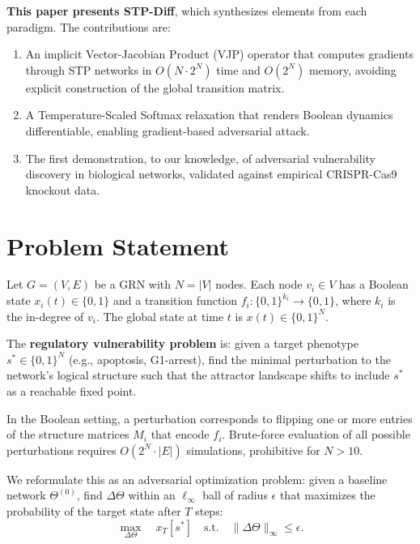 \documentclass[11pt,a4paper]{article}
\begin{document}
\textbf{This paper presents STP-Diff}, which synthesizes elements from each paradigm. The contributions are:
\begin{enumerate}[leftmargin=*]
    \item An implicit Vector-Jacobian Product (VJP) operator that computes gradients through STP networks in $O(N \cdot 2^N)$ time and $O(2^N)$ memory, avoiding explicit construction of the global transition matrix.
    \item A Temperature-Scaled Softmax relaxation that renders Boolean dynamics differentiable, enabling gradient-based adversarial attack.
    \item The first demonstration, to our knowledge, of adversarial vulnerability discovery in biological networks, validated against empirical CRISPR-Cas9 knockout data.
\end{enumerate}

\section{Problem Statement}
\label{sec:problem}

Let $G = (V, E)$ be a GRN with $N = |V|$ nodes. Each node $v_i \in V$ has a Boolean state $x_i(t) \in \{0, 1\}$ and a transition function $f_i: \{0,1\}^{k_i} \to \{0,1\}$, where $k_i$ is the in-degree of $v_i$. The global state at time $t$ is $x(t) \in \{0,1\}^N$.

The \textbf{regulatory vulnerability problem} is: given a target phenotype $s^* \in \{0,1\}^N$ (e.g., apoptosis, G1-arrest), find the minimal perturbation to the network's logical structure such that the attractor landscape shifts to include $s^*$ as a reachable fixed point.

In the Boolean setting, a perturbation corresponds to flipping one or more entries of the structure matrices $M_i$ that encode $f_i$. Brute-force evaluation of all possible perturbations requires $O(2^N \cdot |E|)$ simulations, prohibitive for $N > 10$.

We reformulate this as an adversarial optimization problem: given a baseline network $\Theta^{(0)}$, find $\Delta\Theta$ within an $\ell_\infty$ ball of radius $\epsilon$ that maximizes the probability of the target state after $T$ steps:
\begin{equation}\label{eq:adversarial_objective}
\max_{\Delta\Theta} \quad x_T[s^*] \quad \text{s.t.} \quad \|\Delta\Theta\|_\infty \leq \epsilon.
\end{equation}
\end{document}
